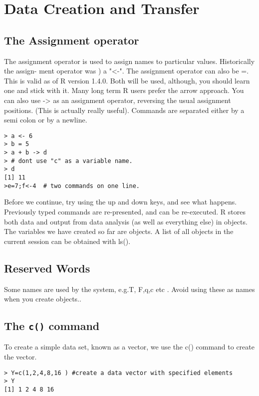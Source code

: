 


\section{Data Creation and Transfer}

\subsection{The Assignment operator}
The assignment operator is used to assign names to particular values. Historically the assign-
ment operator was ) a "<-". 
The assignment operator can also be =. This is valid as of R
version 1.4.0.
Both will be used, although, you should learn one and stick with it. Many long term R
users prefer the arrow approach. You can also use -> as an assignment operator, reversing the
usual assignment positions. (This is actually really useful). Commands are separated either by
a semi colon or by a newline.
\begin{framed}
\begin{verbatim}
> a <- 6
> b = 5
> a + b -> d
> # dont use "c" as a variable name.
> d
[1] 11
>e=7;f<-4  # two commands on one line.
\end{verbatim}
\end{framed}


Before we continue, try using the up and down keys, and see what happens. Previously
typed commands are re-presented, and can be re-executed.
R stores both data and output from data analysis (as well as everything else) in objects.
The variables we have created so far are objects. A list of all objects in the current session can
be obtained with ls().
\subsection*{Reserved Words}
Some names are used by the system, e.g.T, F,q,c etc . Avoid using these as names when you create objects..

\subsection*{ The \texttt{c()} command}
To create a simple data set, known as a vector, we use the c() command to create the vector.
\begin{verbatim}
> Y=c(1,2,4,8,16 ) #create a data vector with specified elements
> Y
[1] 1 2 4 8 16
\end{verbatim}
